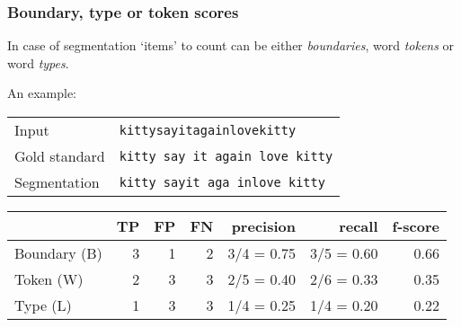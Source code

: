 
\begin{frame}
\frametitle{Boundary, type or token scores}
In case of segmentation `items' to count can be either
\emph{boundaries}, word \emph{tokens} or word \emph{types}.

\vspace{2mm}
An example:

\vspace{2mm}
\begin{tabular}{ll}
Input &  \texttt{kittysayitagainlovekitty}\\
Gold standard & \texttt{kitty say it again love kitty}\\
Segmentation &\texttt{kitty sayit aga inlove kitty}\\
\end{tabular}

\vspace{4mm}
\begin{tabular}{|l|r|r|r|r|r|r|}\hline
             & TP &FP &FN & precision &    recall &f-score\\\hline
\hline
Boundary (B) &  3 & 1 & 2 & 3/4 = 0.75& 3/5 = 0.60& 0.66\\\hline
Token    (W) &  2 & 3 & 3 & 2/5 = 0.40& 2/6 = 0.33& 0.35\\\hline
Type     (L) &  1 & 3 & 3 & 1/4 = 0.25& 1/4 = 0.20& 0.22\\\hline
\end{tabular}

\end{frame}
